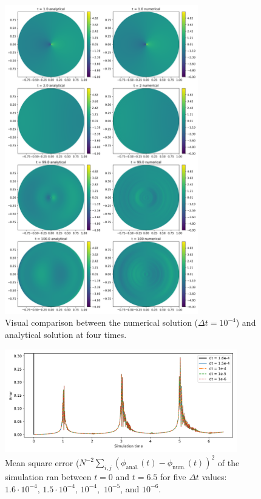 \documentclass{homework}
\begin{document}
\begin{figure}[h!]
    \centering
    \includegraphics[width = 0.75\textwidth]{media/big_comparison.png}
    \caption{Visual comparison between the numerical solution ($\Delta t = 10^{-4}$) and analytical solution at four times.}
\label{big}\end{figure}
\begin{figure}[H]
    \centering
    \includegraphics[width = 0.9\textwidth]{media/MSE_comparison.png}
    \caption{Mean square error ($N^{-2} \sum_{i,j} (\phi_\text{anal.}(t) - \phi_\text{num.}(t))^2$ of the simulation ran between $t=0$ and $t=6.5$ for five $\Delta t$ values: $1.6\cdot 10^{-4}, \,1.5\cdot 10^{-4}, \,10^{-4}$,\, $10^{-5}$, and $10^{-6}$.}
\label{MSE_all}\end{figure}
\end{document}

